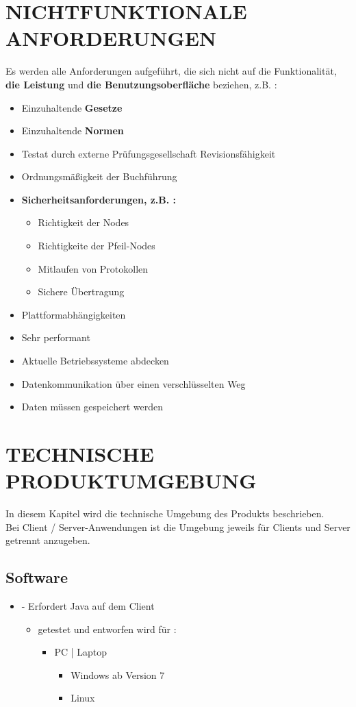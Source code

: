 	\section{\Large NICHTFUNKTIONALE ANFORDERUNGEN}
	Es werden alle Anforderungen aufgeführt, die sich nicht auf die Funktionalität, \textbf{ die Leistung} und \textbf{ die Benutzungsoberfläche} beziehen, z.B. :
	\begin{itemize}
		\item Einzuhaltende \textbf{Gesetze}
		\item Einzuhaltende \textbf{Normen}
		\item Testat durch externe Prüfungsgesellschaft
		Revisionsfähigkeit 
		\item Ordnungsmäßigkeit der Buchführung
		\item \textbf{ Sicherheitsanforderungen, z.B. :}
		\begin{itemize}
			\item Richtigkeit der Nodes
			\item Richtigkeite der Pfeil-Nodes
			\item Mitlaufen von Protokollen
			\item Sichere Übertragung
		\end{itemize}  
		\item Plattformabhängigkeiten
		\item Sehr performant
		\item Aktuelle Betriebssysteme abdecken
		\item Datenkommunikation über einen verschlüsselten Weg
		\item Daten müssen gespeichert werden	 
	\end{itemize} 

	
	\section{\Large TECHNISCHE PRODUKTUMGEBUNG}
   	In diesem Kapitel wird die technische Umgebung des Produkts beschrieben.\\
   	Bei Client / Server-Anwendungen ist die Umgebung jeweils für Clients und Server getrennt anzugeben.
	\subsection{Software}
	\begin{itemize}
		\item - Erfordert Java auf dem Client
		\begin{itemize}
			\item getestet und entworfen wird für :
			\begin{itemize}
				\item PC | Laptop
				\begin{itemize}
					\item Windows ab Version 7
					\item Linux
				\end{itemize}
			\end{itemize}
		\end{itemize}
	\end{itemize}
